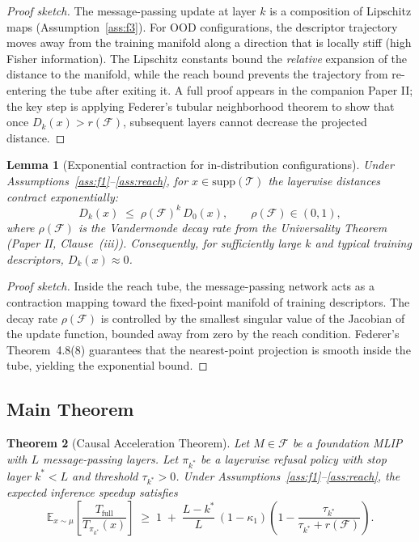 \documentclass[11pt,a4paper]{article}
\newtheorem{theorem}{Theorem}[section]
\newtheorem{lemma}[theorem]{Lemma}
\begin{document}
\begin{proof}[Proof sketch]
    The message-passing update at layer $k$ is a composition of Lipschitz maps (Assumption~\ref{ass:f3}). For OOD configurations, the descriptor trajectory moves away from the training manifold along a direction that is locally stiff (high Fisher information). The Lipschitz constants bound the \emph{relative} expansion of the distance to the manifold, while the reach bound prevents the trajectory from re-entering the tube after exiting it. A full proof appears in the companion Paper II; the key step is applying Federer's tubular neighborhood theorem to show that once $D_k(x)>r(\mathcal{F})$, subsequent layers cannot decrease the projected distance.
\end{proof}

\begin{lemma}[Exponential contraction for in-distribution configurations]\label{lem:contraction}
    Under Assumptions~\ref{ass:f1}--\ref{ass:reach}, for $x\in\text{supp}(\mathcal{T})$ the layerwise distances contract exponentially:
    \begin{equation}\label{eq:contraction}
        D_k(x) \;\le\; \rho(\mathcal{F})^{k}\, D_0(x), \qquad \rho(\mathcal{F})\in(0,1),
    \end{equation}
    where $\rho(\mathcal{F})$ is the Vandermonde decay rate from the Universality Theorem (Paper II, Clause~(iii)). Consequently, for sufficiently large $k$ and typical training descriptors, $D_k(x)\approx 0$.
\end{lemma}

\begin{proof}[Proof sketch]
    Inside the reach tube, the message-passing network acts as a contraction mapping toward the fixed-point manifold of training descriptors. The decay rate $\rho(\mathcal{F})$ is controlled by the smallest singular value of the Jacobian of the update function, bounded away from zero by the reach condition. Federer's Theorem~4.8(8) guarantees that the nearest-point projection is smooth inside the tube, yielding the exponential bound.
\end{proof}

\subsection{Main Theorem}\label{sec:theorem}

\begin{theorem}[Causal Acceleration Theorem]\label{thm:main}
    Let $M\in\mathcal{F}$ be a foundation MLIP with $L$ message-passing layers. Let $\pi_{k^*}$ be a layerwise refusal policy with stop layer $k^*<L$ and threshold $\tau_{k^*}>0$. Under Assumptions~\ref{ass:f1}--\ref{ass:reach}, the expected inference speedup satisfies
    \begin{equation}\label{eq:main}
        \mathbb{E}_{x\sim\mu}\!\left[\frac{T_{\text{full}}}{T_{\pi_{k^*}}(x)}\right]
        \;\ge\;
        1 \;+\; \frac{L-k^*}{L}\, (1-\kappa_1) \left(1 - \frac{\tau_{k^*}}{\tau_{k^*} + r(\mathcal{F})}\right).
    \end{equation}
\end{theorem}
\end{document}
